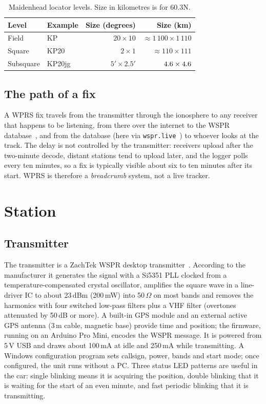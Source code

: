 \documentclass[10pt,a4paper]{article}
\begin{document}
\begin{table}[htbp]\centering\small
\caption{Maidenhead locator levels. Size in kilometres is for 60.3\textdegree N.}\label{tab:mh}
\begin{tabular}{llrr}\toprule
Level & Example & Size (degrees) & Size (km) \\\midrule
Field & KP & $20\times10$ & $\approx 1\,100\times1\,110$ \\
Square & KP20 & $2\times1$ & $\approx 110\times111$ \\
Subsquare & KP20jg & $5'\times2.5'$ & $4.6\times4.6$ \\\bottomrule
\end{tabular}\end{table}

\subsection{The path of a fix}
A WPRS fix travels from the transmitter through the ionosphere to any receiver that happens to be listening, from there over the internet to the WSPR database~\cite{wsprnet}, and from the database (here via \texttt{wspr.live}~\cite{wsprlive}) to whoever looks at the track. The delay is not controlled by the transmitter: receivers upload after the two-minute decode, distant stations tend to upload later, and the logger polls every ten minutes, so a fix is typically visible about six to ten minutes after its start. WPRS is therefore a \emph{breadcrumb} system, not a live tracker.

\section{Station}
\subsection{Transmitter}
The transmitter is a ZachTek WSPR desktop transmitter~\cite{zachtek}. According to the manufacturer it generates the signal with a Si5351 PLL clocked from a temperature-compensated crystal oscillator, amplifies the square wave in a line-driver IC to about 23\,dBm (200\,mW) into 50\,$\Omega$ on most bands and removes the harmonics with four switched low-pass filters plus a VHF filter (overtones attenuated by 50\,dB or more). A built-in GPS module and an external active GPS antenna (3\,m cable, magnetic base) provide time and position; the firmware, running on an Arduino Pro Mini, encodes the WSPR message. It is powered from 5\,V USB and draws about 100\,mA at idle and 250\,mA while transmitting. A Windows configuration program sets callsign, power, bands and start mode; once configured, the unit runs without a PC. Three status LED patterns are useful in the car: single blinking means it is acquiring the position, double blinking that it is waiting for the start of an even minute, and fast periodic blinking that it is transmitting.
\end{document}
